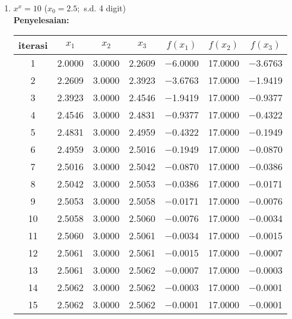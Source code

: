 \documentclass{article}
\newcommand{\penyelesaian}{\textbf{Penyelesaian: }}
\begin{document}
\begin{enumerate}
\begin{enumerate}
        \item $x^x = 10$ ($x_0 = \num{2,5};$ s.d. 4 digit) \\
        \penyelesaian \\
        \begin{tabular}{|c|c|c|c|c|c|c|}
            \hline
            iterasi & $x_1$ & $x_2$ & $x_3$ & $f(x_1)$ & $f(x_2)$ & $f(x_3)$ \\
            \hline
            1 & \num{2,0000} & \num{3,0000} & \num{2,2609} & \num{-6,0000} & \num{17,0000} & \num{-3,6763}\\
            2 & \num{2,2609} & \num{3,0000} & \num{2,3923} & \num{-3,6763} & \num{17,0000} & \num{-1,9419}\\
            3 & \num{2,3923} & \num{3,0000} & \num{2,4546} & \num{-1,9419} & \num{17,0000} & \num{-0,9377}\\
            4 & \num{2,4546} & \num{3,0000} & \num{2,4831} & \num{-0,9377} & \num{17,0000} & \num{-0,4322}\\
            5 & \num{2,4831} & \num{3,0000} & \num{2,4959} & \num{-0,4322} & \num{17,0000} & \num{-0,1949}\\
            6 & \num{2,4959} & \num{3,0000} & \num{2,5016} & \num{-0,1949} & \num{17,0000} & \num{-0,0870}\\
            7 & \num{2,5016} & \num{3,0000} & \num{2,5042} & \num{-0,0870} & \num{17,0000} & \num{-0,0386}\\
            8 & \num{2,5042} & \num{3,0000} & \num{2,5053} & \num{-0,0386} & \num{17,0000} & \num{-0,0171}\\
            9 & \num{2,5053} & \num{3,0000} & \num{2,5058} & \num{-0,0171} & \num{17,0000} & \num{-0,0076}\\
            10 & \num{2,5058} & \num{3,0000} & \num{2,5060} & \num{-0,0076} & \num{17,0000} & \num{-0,0034}\\
            11 & \num{2,5060} & \num{3,0000} & \num{2,5061} & \num{-0,0034} & \num{17,0000} & \num{-0,0015}\\
            12 & \num{2,5061} & \num{3,0000} & \num{2,5061} & \num{-0,0015} & \num{17,0000} & \num{-0,0007}\\
            13 & \num{2,5061} & \num{3,0000} & \num{2,5062} & \num{-0,0007} & \num{17,0000} & \num{-0,0003}\\
            14 & \num{2,5062} & \num{3,0000} & \num{2,5062} & \num{-0,0003} & \num{17,0000} & \num{-0,0001}\\
            15 & \num{2,5062} & \num{3,0000} & \num{2,5062} & \num{-0,0001} & \num{17,0000} & \num{-0,0001}\\

\end{tabular}
\end{enumerate}
\end{enumerate}
\end{document}
